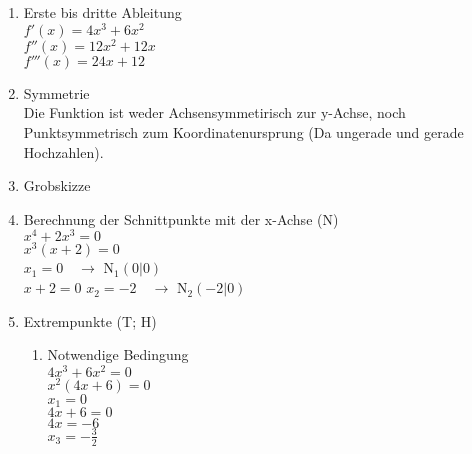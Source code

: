 \begin{enumerate}
    \item Erste bis dritte Ableitung\\
    $f'(x)=4x^3+6x^2$\\
    $f''(x)=12x^2+12x$\\
    $f'''(x)=24x+12$
    \item Symmetrie\\
    Die Funktion ist weder Achsensymmetirisch zur y-Achse, noch Punktsymmetrisch zum Koordinatenursprung
    (Da ungerade und gerade Hochzahlen).
    \item Grobskizze\\
    \item Berechnung der Schnittpunkte mit der x-Achse (N)\\
    $x^4+2x^3=0$\\
    $x^3(x+2)=0$\\
    $x_1=0\quad \rightarrow$ N$_1(0|0)$\\
    $x+2=0$
    $x_2=-2\quad \rightarrow$ N$_2(-2|0)$
    \item Extrempunkte (T; H)\\
    \begin{enumerate}
        \item Notwendige Bedingung\\
        $4x^3+6x^2=0$\\
        $x^2(4x+6)=0$\\
        $x_1=0$\\
        $4x+6=0$\\
        $4x=-6$\\
        $x_3=-\frac{3}{2}$

\end{enumerate}
\end{enumerate}

